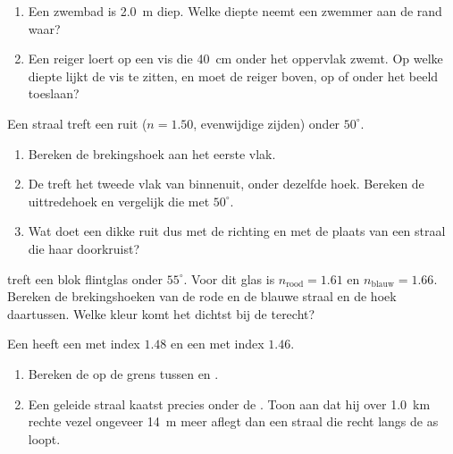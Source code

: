 \begin{exercise}[$\star\star$]\label{exo:g10:refraction:8}
\begin{enumerate}
  \item Een zwembad is \qty{2.0}{m} diep. Welke diepte neemt een
        zwemmer aan de rand waar?
  \item Een reiger loert op een vis die \qty{40}{cm} onder het oppervlak
        zwemt. Op welke diepte lijkt de vis te zitten, en moet de reiger
        boven, op of onder het beeld toeslaan?
\end{enumerate}
\end{exercise}

\begin{exercise}[$\star\star$]\label{exo:g10:refraction:9}
Een straal treft een ruit ($n = 1.50$, evenwijdige zijden) onder
$50^\circ$.
\begin{enumerate}
  \item Bereken de brekingshoek aan het eerste vlak.
  \item De  treft het tweede vlak van binnenuit, onder
        dezelfde hoek. Bereken de uittredehoek en vergelijk die met
        $50^\circ$.
  \item Wat doet een dikke ruit dus met de richting en met de plaats van
        een straal die haar doorkruist?
\end{enumerate}
\end{exercise}

\begin{exercise}[$\star\star$]\label{exo:g10:refraction:10}
 treft een blok flintglas onder $55^\circ$. Voor dit glas is
$n_{\text{rood}} = 1.61$ en $n_{\text{blauw}} = 1.66$. Bereken de
brekingshoeken van de rode en de blauwe straal en de hoek daartussen.
Welke kleur komt het dichtst bij de  terecht?
\end{exercise}

\begin{exercise}[$\star\star$]\label{exo:g10:refraction:11}
Een  heeft een  met index $1.48$ en een  met index
$1.46$.
\begin{enumerate}
  \item Bereken de  op de grens tussen  en .
  \item Een geleide straal kaatst precies onder de . Toon aan
        dat hij over \qty{1.0}{km} rechte vezel ongeveer \qty{14}{m}
        meer aflegt dan een straal die recht langs de as loopt.
\end{enumerate}
\end{exercise}

